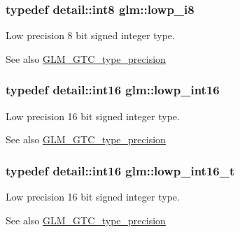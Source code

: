 \subsubsection[{lowp\+\_\+i8}]{\setlength{\rightskip}{0pt plus 5cm}typedef detail\+::int8 {\bf glm\+::lowp\+\_\+i8}}\label{group__gtc__type__precision_gaa2e13ee29c90f75658beed6082541097}
Low precision 8 bit signed integer type. \begin{DoxySeeAlso}{See also}
\hyperlink{group__gtc__type__precision}{G\+L\+M\+\_\+\+G\+T\+C\+\_\+type\+\_\+precision} 
\end{DoxySeeAlso}
\hypertarget{group__gtc__type__precision_ga71fc0c399fa4780507748b643733f153}{}
\subsubsection[{lowp\+\_\+int16}]{\setlength{\rightskip}{0pt plus 5cm}typedef {\bf detail\+::int16} {\bf glm\+::lowp\+\_\+int16}}\label{group__gtc__type__precision_ga71fc0c399fa4780507748b643733f153}
Low precision 16 bit signed integer type. \begin{DoxySeeAlso}{See also}
\hyperlink{group__gtc__type__precision}{G\+L\+M\+\_\+\+G\+T\+C\+\_\+type\+\_\+precision} 
\end{DoxySeeAlso}
\hypertarget{group__gtc__type__precision_gae34c3d53c4c1434fc9f26538b0185667}{}
\subsubsection[{lowp\+\_\+int16\+\_\+t}]{\setlength{\rightskip}{0pt plus 5cm}typedef {\bf detail\+::int16} {\bf glm\+::lowp\+\_\+int16\+\_\+t}}\label{group__gtc__type__precision_gae34c3d53c4c1434fc9f26538b0185667}
Low precision 16 bit signed integer type. \begin{DoxySeeAlso}{See also}
\hyperlink{group__gtc__type__precision}{G\+L\+M\+\_\+\+G\+T\+C\+\_\+type\+\_\+precision} 
\end{DoxySeeAlso}
\hypertarget{group__gtc__type__precision_gad9939c9d6fec1c6accc02a83c6500f08}{}
